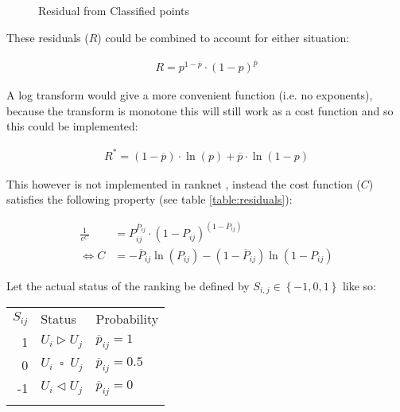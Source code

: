 \documentclass[a4paper,11pt,twoside]{article}
\begin{document}
\begin{figure}[htbp]
\centering

\caption{\label{fig:residual_classification}Residual from Classified points}
\end{figure}

These residuals (\(R\)) could be combined to account for either situation:


\begin{align}
      R= p^{1- \overline{p}}\cdot  \left( 1- p \right)^{\overline{p}}
\end{align}

A log transform would give a more convenient function (i.e. no exponents),
because the transform is monotone this will still work as a cost function and
so this could be implemented:

\begin{align}
     R^{*} = \left( 1- \overline{p} \right)\cdot  \ln\left( p \right) + \overline{p} \cdot  \ln\left( 1- p \right)
\end{align}

This however is not implemented in ranknet \cite{christopherburgesRankNetLambdaRankLambdaMART2010}, instead the cost function (\(C\)) satisfies the following property (see table \ref{table:residuals}):

\begin{align}
      \frac{1}{e^{C}} &= P_{ij}^{ \overline{P}_{ij}} \cdot  \left( 1- P_{ij} \right)^{\left( 1-\overline{P}_{ij} \right)} \\
       \iff C &= - \overline{P}_{ij} \ln\left( P_{ij} \right) - \left( 1 - \overline{P}_{ij} \right)\ln\left( 1- P_{ij} \right) \label{eq:cost}
\end{align}


Let the actual status of the ranking be defined by \(S_{i,j}\in \left\{-1, 0, 1\right\}\) like so:

\begin{center}
\begin{tabular}{rll}
\(S_{ij}\) & Status & Probability\\
1 & \(U_{i} \triangleright U_{j}\) & \(\overline{p}_{ij}=1\)\\
0 & \(U_{i} \enspace \square \enspace U_{j}\) & \(\overline{p}_{ij}=0.5\)\\
-1 & \(U_{i} \triangleleft U_{j}\) & \(\overline{p}_{ij}=0\)\\
 &  & \\
\end{tabular}

\end{center}
\end{document}

